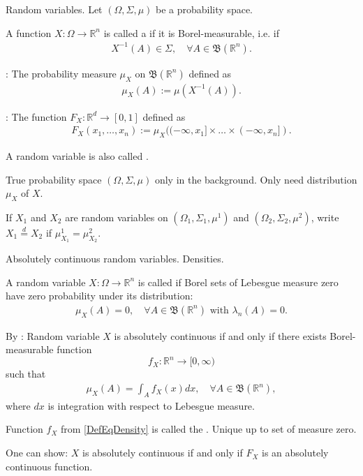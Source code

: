 \begin{frame}{Random variables. }
Let $(\Omega,\Sigma,\mu)$ be a probability space. 
\bit
\item<1-> A function $X:\Omega\to\mathbb{R}^n$ is
called a  if it is Borel-measurable, i.e. if 
\begin{align*}
X^{-1}(A)\in\Sigma, \quad \forall A\in\mathfrak{B}(\mathbb{R}^n). 
\end{align*}
\item<2-> : The probability measure $\mu_X$ on $\mathfrak{B}(\mathbb{R}^n)$ defined as
\begin{align*}
\mu_X(A):=\mu(X^{-1}(A)).
\end{align*}
\item<3-> : The function $F_X:\mathbb{R}^d\to [0,1]$ defined as
\begin{align*}
F_X(x_1,\dots,x_n):=\mu_X((-\infty,x_1]\times\dots\times (-\infty,x_n]). 
\end{align*}   
\eit
{}
\bit
\item<4-> A random variable is also called .
\item<5-> True probability space $(\Omega,\Sigma,\mu)$ only in the background. Only need distribution
$\mu_X$ of $X$. 
\item<6-> [\iarrow] If $X_1$ and $X_2$ are random variables on $(\Omega_1,\Sigma_1,\mu^1)$ and $(\Omega_2,\Sigma_2,\mu^2)$,
write $X_1\stackrel{d}{=}X_2$ if $\mu^1_{X_1}=\mu^2_{X_2}$.
\eit 
\end{frame}


\begin{frame}{Absolutely continuous random variables. Densities.}
\bit
\item<1-> A random variable $X:\Omega\to\mathbb{R}^n$ is called  if Borel sets of Lebesgue measure zero have zero probability
under its distribution:
\begin{align*}
\mu_X(A)=0,\quad \text{$\forall A\in\mathfrak{B}(\mathbb{R}^n)$ with $\lambda_n(A)=0$}.
\end{align*} 
\item<2-> By : Random variable $X$ is absolutely continuous if and only if
there exists Borel-measurable function
\[
f_X:\mathbb{R}^n\to[0,\infty)
\]
such that 
\begin{align}\label{DefEqDensity} 
\mu_X(A)=\int_{A}f_X(x)dx,\quad \forall A\in\mathfrak{B}(\mathbb{R}^n),
\end{align}
where $dx$ is integration with respect to Lebesgue measure.
\item<3-> Function $f_X$ from \eqref{DefEqDensity} is called the . Unique up to set of measure zero.
\item<4-> One can show: $X$ is absolutely continuous if and only if $F_X$ is an absolutely continuous function.
\eit
\end{frame}

